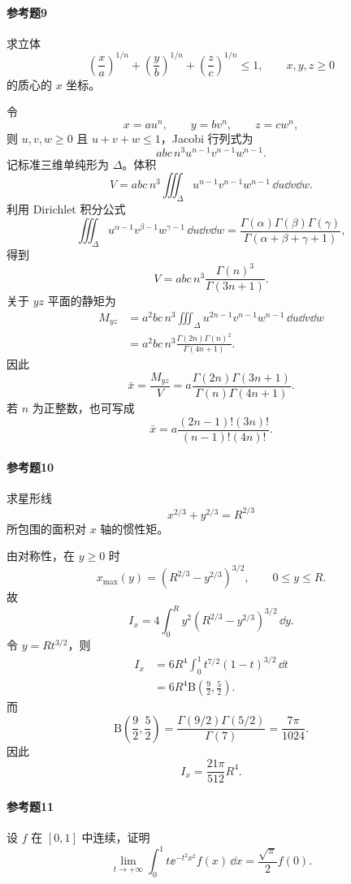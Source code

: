 \paragraph{参考题9}
求立体
\[
\left(\frac xa\right)^{1/n}
+\left(\frac yb\right)^{1/n}
+\left(\frac zc\right)^{1/n}\leqslant1,
\qquad x,y,z\geqslant0
\]
的质心的 $x$ 坐标。

\begin{xsolution}
令
\[
x=au^n,\qquad y=bv^n,\qquad z=cw^n,
\]
则 $u,v,w\geqslant0$ 且 $u+v+w\leqslant1$，Jacobi 行列式为
\[
abc\,n^3u^{n-1}v^{n-1}w^{n-1}.
\]
记标准三维单纯形为 $\Delta$。体积
\[
V=abc\,n^3\iiint_\Delta
u^{n-1}v^{n-1}w^{n-1}\,\dd u\dd v\dd w.
\]
利用 Dirichlet 积分公式
\[
\iiint_\Delta
u^{\alpha-1}v^{\beta-1}w^{\gamma-1}\,\dd u\dd v\dd w
=\frac{\Gamma(\alpha)\Gamma(\beta)\Gamma(\gamma)}
{\Gamma(\alpha+\beta+\gamma+1)},
\]
得到
\[
V=abc\,n^3\frac{\Gamma(n)^3}{\Gamma(3n+1)}.
\]
关于 $yz$ 平面的静矩为
\[
\begin{aligned}
M_{yz}
&=a^2bc\,n^3\iiint_\Delta
u^{2n-1}v^{n-1}w^{n-1}\,\dd u\dd v\dd w\\
&=a^2bc\,n^3
\frac{\Gamma(2n)\Gamma(n)^2}{\Gamma(4n+1)}.
\end{aligned}
\]
因此
\[
\boxed{
\bar x=\frac{M_{yz}}V
=a\frac{\Gamma(2n)\Gamma(3n+1)}
{\Gamma(n)\Gamma(4n+1)}.}
\]
若 $n$ 为正整数，也可写成
\[
\boxed{
\bar x
=a\frac{(2n-1)!(3n)!}{(n-1)!(4n)!}.}
\]
\end{xsolution}

\paragraph{参考题10}
求星形线
\[
x^{2/3}+y^{2/3}=R^{2/3}
\]
所包围的面积对 $x$ 轴的惯性矩。

\begin{xsolution}
由对称性，在 $y\geqslant0$ 时
\[
x_{\max}(y)=\left(R^{2/3}-y^{2/3}\right)^{3/2},
\qquad0\leqslant y\leqslant R.
\]
故
\[
I_x=4\int_0^R y^2
\left(R^{2/3}-y^{2/3}\right)^{3/2}\,\dd y.
\]
令 $y=Rt^{3/2}$，则
\[
\begin{aligned}
I_x
&=6R^4\int_0^1t^{7/2}(1-t)^{3/2}\,\dd t\\
&=6R^4\mathrm{B}\left(\frac92,\frac52\right).
\end{aligned}
\]
而
\[
\mathrm{B}\left(\frac92,\frac52\right)
=\frac{\Gamma(9/2)\Gamma(5/2)}{\Gamma(7)}
=\frac{7\pi}{1024}.
\]
因此
\[
\boxed{I_x=\frac{21\pi}{512}R^4}.
\]
\end{xsolution}

\paragraph{参考题11}
设 $f$ 在 $[0,1]$ 中连续，证明
\[
\lim_{t\to+\infty}
\int_0^1t\ee^{-t^2x^2}f(x)\,\dd x
=\frac{\sqrt\pi}{2}f(0).
\]

